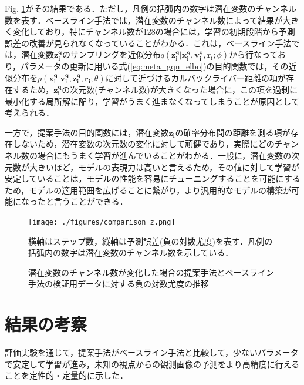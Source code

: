 Fig. \ref{fig:comparizon_z}がその結果である．ただし，凡例の括弧内の数字は潜在変数のチャンネル数を表す．ベースライン手法では，潜在変数のチャンネル数によって結果が大きく変化しており，特にチャンネル数が128の場合には，学習の初期段階から予測誤差の改善が見られなくなっていることがわかる．これは，ベースライン手法では，潜在変数$\bm{z_i^q}$のサンプリングを近似分布$q(\bm{z_i^q}|\bm{x_i^q}, \bm{v_i^q}, \bm{r_i}; \phi)$から行なっており，パラメータの更新に用いる式(\ref{eq:meta_gqn_elbo})の目的関数では，その近似分布を$p ( \bm{x_i ^ q} | \bm{v_i ^ q} , \bm{z _i^ q} , \bm{r_i} ; \theta )$に対して近づけるカルバックライバー距離の項が存在するため，$\bm{z_i^q}$の次元数(チャンネル数)が大きくなった場合に，この項を過剰に最小化する局所解に陥り，学習がうまく進まなくなってしまうことが原因として考えられる．

一方で，提案手法の目的関数には，潜在変数$\bm{z_i}$の確率分布間の距離を測る項が存在しないため，潜在変数の次元数の変化に対して頑健であり，実際にどのチャンネル数の場合にもうまく学習が進んでいることがわかる．一般に，潜在変数の次元数が大きいほど，モデルの表現力は高いと言えるため，その値に対して学習が安定していることは，モデルの性能を容易にチューニングすることを可能にするため，モデルの適用範囲を広げることに繋がり，より汎用的なモデルの構築が可能になったと言うことができる．

\begin{figure}[tbp]
  \begin{center}
    \texttt{[image: ./figures/comparison\_z.png]}
    \caption{潜在変数のチャンネル数が変化した場合の提案手法とベースライン手法の検証用データに対する負の対数尤度の推移}
   \end{center}
    横軸はステップ数，縦軸は予測誤差(負の対数尤度)を表す．凡例の括弧内の数字は潜在変数のチャンネル数を示している．
    \label{fig:comparizon_z}
\end{figure}

\section{結果の考察}
評価実験を通じて，提案手法がベースライン手法と比較して，少ないパラメータで安定して学習が進み，未知の視点からの観測画像の予測をより高精度に行えることを定性的・定量的に示した．

